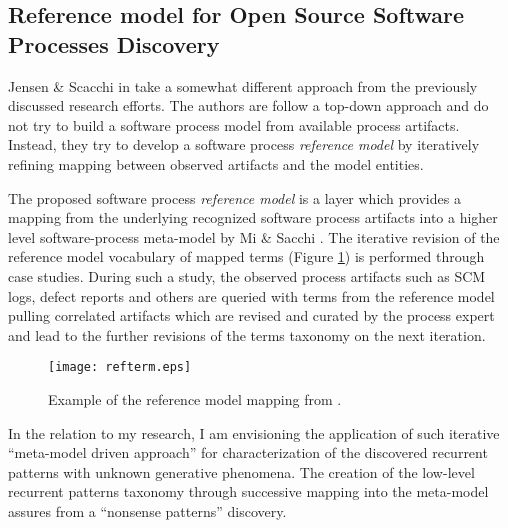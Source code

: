\subsection{Reference model for Open Source Software Processes Discovery}
Jensen \& Scacchi in \cite{citeulike:5043664} take a somewhat different approach from the previously discussed research efforts. The authors are follow a top-down approach and do not try to build a software process model from available process artifacts. Instead, they try to develop a software process \textit{reference model} by iteratively refining mapping between observed artifacts and the model entities. 

The proposed software process \textit{reference model} is a layer which provides a mapping from the underlying recognized software process artifacts into a higher level software-process meta-model by Mi \& Sacchi \cite{citeulike:5128872}. The iterative revision of the reference model vocabulary of mapped terms (Figure \ref{fig:refterm}) is performed through case studies. During such a study, the observed process artifacts such as SCM logs, defect reports and others are queried with terms from the reference model pulling correlated artifacts which are revised and curated by the process expert and lead to the further revisions of the terms taxonomy on the next iteration.

\begin{figure}[tbp]
   \centering
   \texttt{[image: refterm.eps]}
   \caption{Example of the reference model mapping from \cite{citeulike:5043664}.}
   \label{fig:refterm}
\end{figure}

In the relation to my research, I am envisioning the application of such iterative ``meta-model driven approach'' for characterization of the discovered recurrent patterns with unknown generative phenomena. The creation of the low-level recurrent patterns taxonomy through successive mapping into the meta-model assures from a ``nonsense patterns'' discovery.

